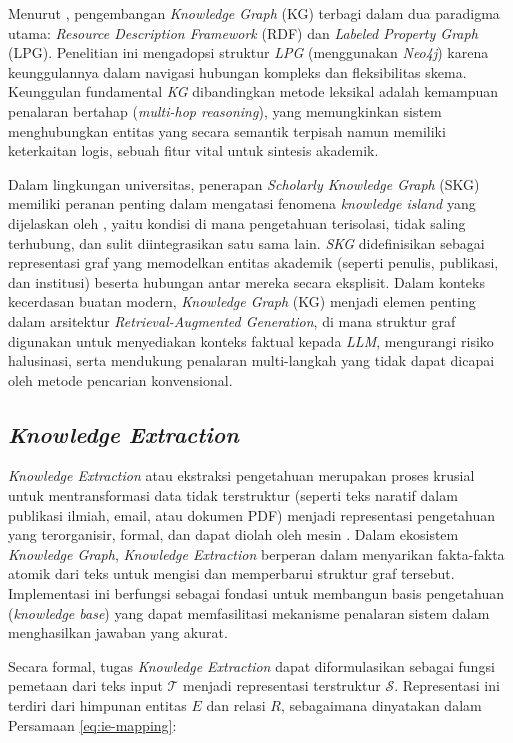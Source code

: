 Menurut \citet{Hofer_2024}, pengembangan \textit{Knowledge Graph} (KG) terbagi dalam dua paradigma utama: \textit{Resource Description Framework} (RDF) dan \textit{Labeled Property Graph} (LPG). Penelitian ini mengadopsi struktur \textit{LPG} (menggunakan \textit{Neo4j}) karena keunggulannya dalam navigasi hubungan kompleks dan fleksibilitas skema. Keunggulan fundamental \textit{KG} dibandingkan metode leksikal adalah kemampuan penalaran bertahap (\textit{multi-hop reasoning}), yang memungkinkan sistem menghubungkan entitas yang secara semantik terpisah namun memiliki keterkaitan logis, sebuah fitur vital untuk sintesis akademik.

Dalam lingkungan universitas, penerapan \textit{Scholarly Knowledge Graph} (SKG) memiliki peranan penting dalam mengatasi fenomena \textit{knowledge island} yang dijelaskan oleh \cite{YU201748}, yaitu kondisi di mana pengetahuan terisolasi, tidak saling terhubung, dan sulit diintegrasikan satu sama lain. \textit{SKG} didefinisikan sebagai representasi graf yang memodelkan entitas akademik (seperti penulis, publikasi, dan institusi) beserta hubungan antar mereka secara eksplisit. Dalam konteks kecerdasan buatan modern, \textit{Knowledge Graph} (KG) menjadi elemen penting dalam arsitektur \textit{Retrieval-Augmented Generation}, di mana struktur graf digunakan untuk menyediakan konteks faktual kepada \textit{LLM}, mengurangi risiko halusinasi, serta mendukung penalaran multi-langkah yang tidak dapat dicapai oleh metode pencarian konvensional.

\subsection{\textit{Knowledge Extraction}}
\textit{Knowledge Extraction} atau ekstraksi pengetahuan merupakan proses krusial untuk mentransformasi data tidak terstruktur (seperti teks naratif dalam publikasi ilmiah, email, atau dokumen PDF) menjadi representasi pengetahuan yang terorganisir, formal, dan dapat diolah oleh mesin \citep{WANG2018112}. Dalam ekosistem \textit{Knowledge Graph}, \textit{Knowledge Extraction} berperan dalam menyarikan fakta-fakta atomik dari teks untuk mengisi dan memperbarui struktur graf tersebut. Implementasi ini berfungsi sebagai fondasi untuk membangun basis pengetahuan (\textit{knowledge base}) yang dapat memfasilitasi mekanisme penalaran sistem dalam menghasilkan jawaban yang akurat.

Secara formal, tugas \textit{Knowledge Extraction} dapat diformulasikan sebagai fungsi pemetaan dari teks input \(\mathcal{T}\) menjadi representasi terstruktur \(\mathcal{S}\). Representasi ini terdiri dari himpunan entitas \(E\) dan relasi \(R\), sebagaimana dinyatakan dalam Persamaan \ref{eq:ie-mapping}:


